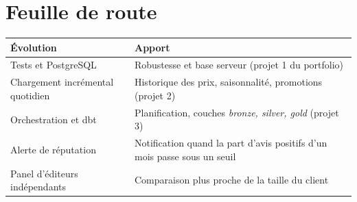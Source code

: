 \documentclass[11pt, a4paper, oneside, headings=normal, numbers=noenddot, DIV=12]{scrartcl}
\begin{document}
\section{Feuille de route}
\begin{tabularx}{\linewidth}{@{}L{4.3cm} Y@{}}
\toprule
\textbf{Évolution} & \textbf{Apport} \\
\midrule
Tests et PostgreSQL & Robustesse et base serveur (projet 1 du portfolio) \\
Chargement incrémental quotidien & Historique des prix, saisonnalité, promotions (projet 2) \\
Orchestration et dbt & Planification, couches \emph{bronze, silver, gold} (projet 3) \\
Alerte de réputation & Notification quand la part d'avis positifs d'un mois passe sous un seuil \\
Panel d'éditeurs indépendants & Comparaison plus proche de la taille du client \\
\bottomrule
\end{tabularx}

\appendix
\end{document}
